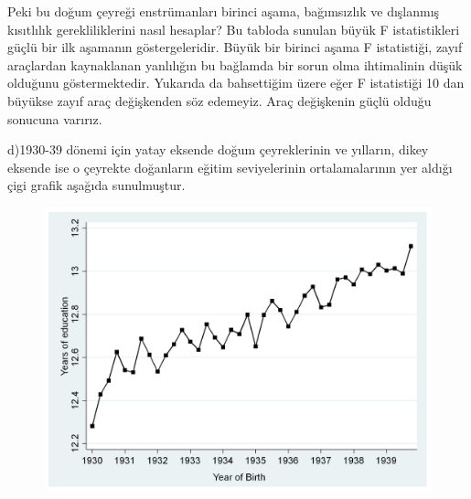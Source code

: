 \documentclass[a4paper]{article}
\begin{document}
 \item
  Peki bu doğum çeyreği enstrümanları birinci aşama, bağımsızlık ve dışlanmış kısıtlılık gerekliliklerini nasıl hesaplar? Bu tabloda sunulan büyük F istatistikleri güçlü bir ilk aşamanın göstergeleridir. 
 Büyük bir birinci aşama F istatistiği, zayıf araçlardan kaynaklanan yanlılığın bu bağlamda bir sorun olma ihtimalinin düşük olduğunu göstermektedir. Yukarıda da bahsettiğim üzere eğer F istatistiği 10 dan büyükse zayıf araç değişkenden söz edemeyiz. Araç değişkenin güçlü olduğu sonucuna varırız.
 \item
 \clearpage
 d)1930-39 dönemi için yatay eksende doğum çeyreklerinin ve yılların, dikey eksende ise o çeyrekte doğanların eğitim seviyelerinin ortalamalarının yer aldığı çigi grafik aşağıda sunulmuştur.
 
 \begin{figure}[ht!]
\centering

\includegraphics[width=150mm]{busraa.png}
\label{overflow}
\end{figure}
\end{document}
